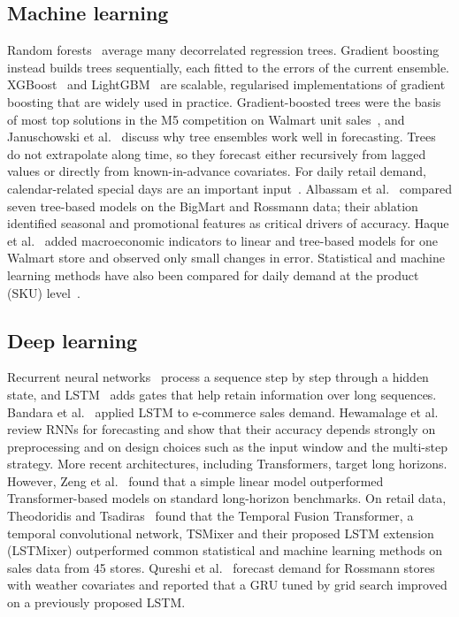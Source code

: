 \documentclass[conference]{IEEEtran}
\begin{document}
\subsection{Machine learning}
Random forests~\cite{breiman2001rf} average many decorrelated regression trees.
Gradient boosting~\cite{friedman2001gbm} instead builds trees sequentially, each fitted to the errors of the current ensemble.
XGBoost~\cite{chen2016xgboost} and LightGBM~\cite{ke2017lightgbm} are scalable, regularised implementations of gradient boosting that are widely used in practice.
Gradient-boosted trees were the basis of most top solutions in the M5 competition on Walmart unit sales~\cite{makridakis2022m5}, and Januschowski et al.~\cite{januschowski2022trees} discuss why tree ensembles work well in forecasting.
Trees do not extrapolate along time, so they forecast either recursively from lagged values or directly from known-in-advance covariates.
For daily retail demand, calendar-related special days are an important input~\cite{huber2020calendric}.
Albassam et al.~\cite{albassam2026tree} compared seven tree-based models on the BigMart and Rossmann data; their ablation identified seasonal and promotional features as critical drivers of accuracy.
Haque et al.~\cite{retail2023multivariate} added macroeconomic indicators to linear and tree-based models for one Walmart store and observed only small changes in error.
Statistical and machine learning methods have also been compared for daily demand at the product (SKU) level~\cite{spiliotis2020sku}.

\subsection{Deep learning}
Recurrent neural networks~\cite{elman1990rnn} process a sequence step by step through a hidden state, and LSTM~\cite{hochreiter1997lstm} adds gates that help retain information over long sequences.
Bandara et al.~\cite{bandara2019lstm} applied LSTM to e-commerce sales demand.
Hewamalage et al.~\cite{hewamalage2021rnn} review RNNs for forecasting and show that their accuracy depends strongly on preprocessing and on design choices such as the input window and the multi-step strategy.
More recent architectures, including Transformers, target long horizons.
However, Zeng et al.~\cite{zeng2023transformers} found that a simple linear model outperformed Transformer-based models on standard long-horizon benchmarks.
On retail data, Theodoridis and Tsadiras~\cite{theodoridis2025lstmixer} found that the Temporal Fusion Transformer, a temporal convolutional network, TSMixer and their proposed LSTM extension (LSTMixer) outperformed common statistical and machine learning methods on sales data from 45 stores.
Qureshi et al.~\cite{qureshi2024rossmann} forecast demand for Rossmann stores with weather covariates and reported that a GRU tuned by grid search improved on a previously proposed LSTM.
\end{document}
